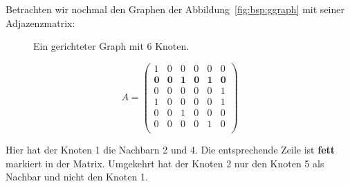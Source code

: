 \begin{mbsp}
Betrachten wir nochmal den Graphen der Abbildung~\ref{fig:bsp:ggraph} mit seiner Adjazenzmatrix:


\begin{figure}[htb]
\begin{center}

\caption{Ein gerichteter Graph mit 6 Knoten.
}
\label{fig:bsp:ggraph2}
\end{center}
\end{figure}



\[ 
A =  \begin{pmatrix}
  1 & 0 & 0 & 0 & 0 & 0 \\
  \textbf{0} & \textbf{0} & \textbf{1} & \textbf{0} & \textbf{1} & \textbf{0} \\
  0 & 0 & 0 & 0 & 0 & 1 \\
  1 & 0 & 0 & 0 & 0 & 1 \\
  0 & 0 & 1 & 0 & 0 & 0 \\
  0 & 0 & 0 & 0 & 1 & 0 \\
 \end{pmatrix}
  \]
  
  
Hier hat der Knoten 1 die Nachbarn 2 und 4.
Die entsprechende Zeile ist \textbf{fett} markiert in der Matrix.
Umgekehrt hat der Knoten 2 nur den Knoten 5 als Nachbar und nicht den Knoten 1.
\end{mbsp}

